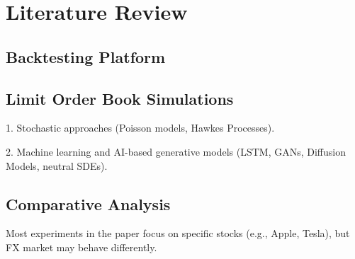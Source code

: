 \chapter{Literature Review}\label{chapter:literature}
\section{Backtesting Platform}

\section{Limit Order Book Simulations}

1. Stochastic approaches (Poisson models, Hawkes Processes).

2. Machine learning and AI-based generative models (LSTM, GANs, Diffusion Models, neutral SDEs).


\section{Comparative Analysis}
Most experiments in the paper focus on specific stocks (e.g., Apple, Tesla), but FX market may behave differently.

